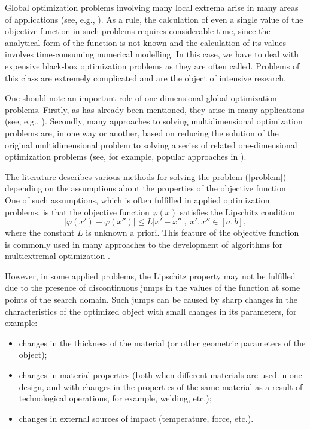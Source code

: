 \documentclass[runningheads]{llncs}
\begin{document}
Global optimization problems involving many local extrema arise in many areas of applications (see, e.g., \cite{Cavoretto2021,Kvasov2015,Kvasov2013,Modorskii2016}). As a rule, the calculation of even a single value of the objective function in such problems requires considerable time, since the analytical form of the function is not known and the calculation of its values involves time-consuming numerical modelling. In this case, we have to deal with expensive black-box optimization problems as they are often called. Problems of this class are extremely complicated and are the object of intensive research.

One should note an important role of one-dimensional global optimization problems. Firstly, as has already been mentioned, they arise in many applications (see, e.g., \cite{Gillard2017,Sergeyev2020}). Secondly, many approaches to solving multidimensional optimization problems are, in one way or another, based on reducing the solution of the original multidimensional problem to solving a series of related one-dimensional optimization problems (see, for example, popular approaches in \cite{Pinter1996,PaulaviciusZilinskas2014,Sergeyev2017,Sergeyev2013}).

The literature describes various methods for solving the problem (\ref{problem}) depending on the assumptions about the properties of the objective function \cite{Horst1995,Horst1996,Pinter1996}. One of such assumptions, which is often fulfilled in applied optimization problems, is that the objective function $\varphi(x)$ satisfies the Lipschitz condition 
\[
\left|\varphi(x')-\varphi(x'')\right|\leq L\left|x'-x''\right|,\; x',x'' \in [a,b],
\]
where the constant $L$ is unknown a priori. 
This feature of the objective function is commonly used in many approaches to the development of algorithms for multiextremal optimization \cite{Evtushenko2009,Evtushenko2013,Jones2009,Paulavicius2011}.



However, in some applied problems, the Lipschitz property may not be fulfilled due to the presence of discontinuous jumps in the values of the function at some points of the search domain. Such jumps can be caused by sharp changes in the characteristics of the optimized object with small changes in its parameters, for example:
\begin{itemize}
  \item changes in the thickness of the material (or other geometric parameters of the object);
  \item changes in material properties (both when different materials are used in one design, and with changes in the properties of the same material as a result of technological operations, for example, welding, etc.);
  \item changes in external sources of impact (temperature, force, etc.).
\end{itemize}
\end{document}
